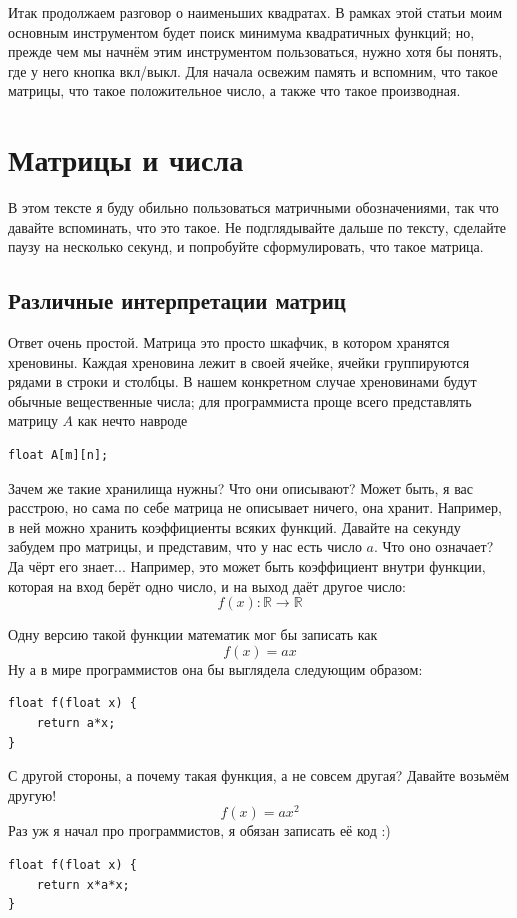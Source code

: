 \documentclass{article}
\begin{document}
Итак продолжаем разговор о наименьших квадратах. В рамках этой статьи моим основным инструментом будет поиск минимума квадратичных функций; но, прежде чем мы начнём этим инструментом пользоваться, нужно хотя бы понять, где у него кнопка вкл/выкл.
Для начала освежим память и вспомним, что такое матрицы, что такое положительное число, а также что такое производная. 

\section{Матрицы и числа}
В этом тексте я буду обильно пользоваться матричными обозначениями, так что давайте вспоминать, что это такое. Не подглядывайте дальше по тексту, сделайте паузу на несколько секунд, и попробуйте сформулировать, что такое матрица.

\subsection{Различные интерпретации матриц}

Ответ очень простой. Матрица это просто шкафчик, в котором хранятся хреновины. Каждая хреновина лежит в своей ячейке, ячейки группируются рядами в строки и столбцы.
В нашем конкретном случае хреновинами будут обычные вещественные числа; для программиста проще всего представлять матрицу $A$ как нечто навроде \begin{verbatim}float A[m][n];\end{verbatim}

Зачем же такие хранилища нужны? Что они описывают? Может быть, я вас расстрою, но сама по себе матрица не описывает ничего, она хранит. Например, в ней можно хранить коэффициенты всяких функций.
Давайте на секунду забудем про матрицы, и представим, что у нас есть число $a$. Что оно означает?
Да чёрт его знает... Например, это может быть коэффициент внутри функции, которая на вход берёт одно число, и на выход даёт другое число:
$$
f(x) : \mathbb R \rightarrow \mathbb R
$$

Одну версию такой функции математик мог бы записать как 
$$
f(x) = ax
$$
Ну а в мире программистов она бы выглядела следующим образом:
\begin{verbatim}    
float f(float x) {
    return a*x;
}
\end{verbatim}

С другой стороны, а почему такая функция, а не совсем другая?
Давайте возьмём другую!
$$
f(x) = ax^2
$$
Раз уж я начал про программистов, я обязан записать её код :)
\begin{verbatim}    
float f(float x) {
    return x*a*x;
}
\end{verbatim}
\end{document}
